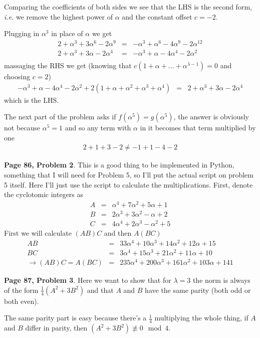 \documentclass[aps,preprint,preprintnumbers,nofootinbib,showpacs,prd]{revtex4-1}
\newcommand{\ie}{{\it i.e.} }
\newcommand{\nbea}{\begin{eqnarray*}}
\newcommand{\neea}{\end{eqnarray*}}
\begin{document}
Comparing the coefficients of both sides we see that the LHS is the second form, \ie we remove the highest power of $\alpha$ and the constant offset $c = -2$.

Plugging in $\alpha^3$ in place of $\alpha$ we get
%
\nbea
2 + \alpha^3 + 3\alpha^6 - 2\alpha^9 & = & -\alpha^3 + \alpha^6 - 4\alpha^9 - 2\alpha^{12} \\
2 + \alpha^3 + 3\alpha - 2\alpha^4 & = & -\alpha^3 + \alpha - 4\alpha^4 - 2\alpha^{2} \\
\neea
%
massaging the RHS we get (knowing that $c(1 + \alpha + \dots + \alpha^{\lambda-1}) = 0$ and choosing $c = 2$)
%
\nbea
-\alpha^3 + \alpha - 4\alpha^4 - 2\alpha^{2} + 2(1 + \alpha + \alpha^2 + \alpha^3 + \alpha^4) & = & 2 + \alpha^3 + 3\alpha - 2\alpha^4
\neea
%
which is the LHS.

The next part of the problem asks if $f(\alpha^5) = g(\alpha^5)$, the answer is obviously not because $\alpha^5 = 1$ and so any term with $\alpha$ in it becomes that term multiplied by one
%
\nbea
2 + 1 + 3 - 2 \neq -1 + 1 - 4 - 2
\neea
%

{\bf Page 86, Problem 2}. This is a good thing to be implemented in Python, something that I will need for Problem 5, so I'll put the actual script on problem 5 itself. Here I'll just use the script to calculate the multiplications. First, denote the cyclotomic integers as
%
\nbea
A & = & \alpha^4 + 7\alpha^2 + 5\alpha + 1 \\
B & = & 2\alpha^3 + 3\alpha^2 - \alpha + 2 \\
C & = & 4\alpha^4 + 2\alpha^3 - \alpha^2 + 5 
\neea
%
First we will calculate $(AB)C$ and then $A(BC)$
%
\nbea
AB & = & 33\alpha^4 + 10 \alpha^3 + 14\alpha^2 + 12\alpha + 15 \\
BC & = & 3\alpha^4 + 15\alpha^3 + 21\alpha^2 + 11\alpha + 10 \\
\to (AB)C = A(BC) & = & 235\alpha^4 + 200\alpha^3 + 161\alpha^2 + 103\alpha + 141
\neea
%

{\bf Page 87, Problem 3}. Here we want to show that for $\lambda = 3$ the norm is always of the form $\frac{1}{4}(A^2 + 3B^2)$ and that $A$ and $B$ have the same parity (both odd or both even).

The same parity part is easy because there's a $\frac{1}{4}$ multiplying the whole thing, if $A$ and $B$ differ in parity, then $(A^2 + 3B^2) \not\equiv 0 \mod{4}$.
\end{document}

